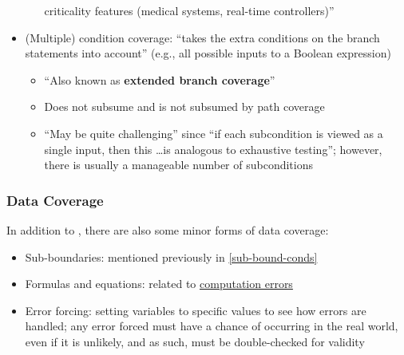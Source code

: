 \begin{itemize}
\begin{itemize}
                        criticality features (medical systems, real-time
                        controllers)'' \citep[p.~481]{PetersAndPedrycz2000}
            \end{itemize}
      \item (Multiple) condition coverage: ``takes the extra conditions on the
            branch statements into account'' (e.g., all possible inputs to a
            Boolean expression) \citep[p.~120]{Patton2006}
            \begin{itemize}
                  \item ``Also known as \textbf{extended branch coverage}''
                        \citep[p.~422]{vanVliet2000}
                  \item Does not subsume and is not subsumed by path coverage
                        \citep[p.~433]{vanVliet2000}
                  \item ``May be quite challenging'' since ``if each
                        subcondition is viewed as a single input, then this
                        \dots is analogous to exhaustive testing''; however,
                        there is usually a manageable number of subconditions
                        \citep[p.~464]{PetersAndPedrycz2000}
            \end{itemize}
\end{itemize}

\subsubsection{Data Coverage \citep[pp.~114-116]{Patton2006}}

In addition to , there are also some minor forms of
data coverage:

\begin{itemize}
      \item Sub-boundaries: mentioned previously in \ref{sub-bound-conds}
      \item Formulas and equations: related to
            \hyperref[comp-errors]{computation errors}
      \item Error forcing: setting variables to specific values to see how
            errors are handled; any error forced must have a chance of
            occurring in the real world, even if it is unlikely, and as such,
            must be double-checked for validity
            \citep[p.~116]{Patton2006}
\end{itemize}


